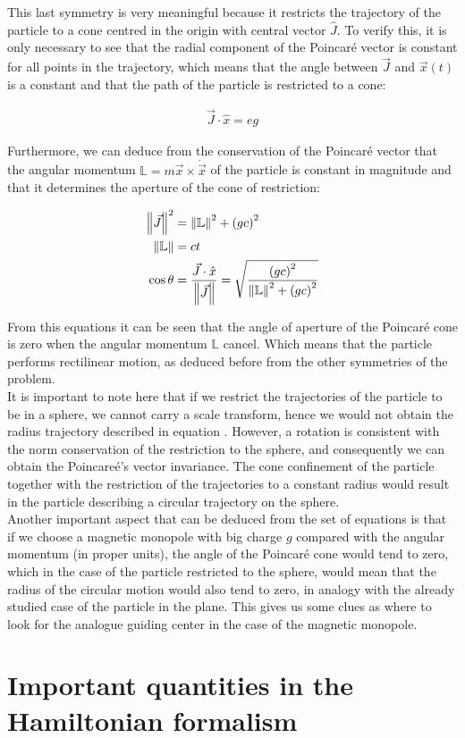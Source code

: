 This last symmetry is very meaningful because it restricts the trajectory of the particle to a cone centred in the origin with central vector $\hat{J}$. To verify this, it is only necessary to see that the radial component of the Poincar\'e vector is constant for all points in the trajectory, which means that the angle between $\vec{J}$ and $\vec{x}(t)$ is a constant and that the path of the particle is restricted to a cone:

\begin{align*}
\vec{J}\cdot\hat{x} = eg
\end{align*}

Furthermore, we can deduce from the conservation of the Poincar\'e vector that the angular momentum $\mathbb{L}= m\vec{x}\times\dot{\vec{x}}$ of the particle is constant in magnitude and that it determines the aperture of the cone of restriction:

\begin{equation}
\begin{aligned}
\left\lVert \vec{J} \right\rVert^2 &= \left\lVert \mathbb{L} \right\rVert^2 +\left( gc \right)^2\\
\left\lVert \mathbb{L} \right\rVert &= ct\\
\cos{\theta} &= \frac{\vec{J}\cdot\hat{x}}{\left\lVert \vec{J} \right\rVert} = \sqrt{\frac{\left( gc \right)^2}{\left\lVert \mathbb{L} \right\rVert^2 +\left( gc \right)^2}}
\end{aligned}
\label{eq:poincarecone}
\end{equation}


From this equations it can be seen that the angle of aperture of the Poincar\'e cone is zero when the angular momentum $\mathbb{L}$ cancel. Which means that the particle performs rectilinear motion, as deduced before from the other symmetries of the problem.\\

It is important to note here that if we restrict the trajectories of the particle to be in a sphere, we cannot carry a scale transform, hence we would not obtain the radius trajectory described in equation . However, a rotation is consistent with the norm conservation of the restriction to the sphere, and consequently we can obtain the Poincare\'e's vector invariance. The cone confinement of the particle together with the restriction of the trajectories to a constant radius would result in the particle describing a circular trajectory on the sphere.\\

Another important aspect that can be deduced from the set of equations  is that if we choose a magnetic monopole with big charge $g$ compared with the angular momentum (in proper units), the angle of the Poincar\'e cone would tend to zero, which in the case of the particle restricted to the sphere, would mean that the radius of the circular motion would also tend to zero, in analogy with the already studied case of the particle in the plane. This gives us some clues as where to look for the analogue guiding center in the case of the magnetic monopole.\\

\section{Important quantities in the Hamiltonian formalism}





